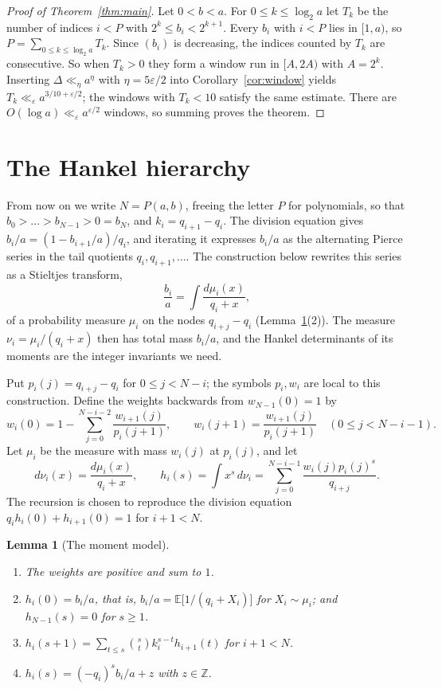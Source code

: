 \documentclass[11pt]{article}
\newtheorem{lemma}[theorem]{Lemma}
\theoremstyle{definition}
\theoremstyle{remark}
\begin{document}
\begin{proof}[Proof of Theorem~\ref{thm:main}]
Let $0<b<a$. For $0\le k\le\log_2 a$ let $T_k$ be the number of indices $i<P$ with
$2^k\le b_i<2^{k+1}$. Every $b_i$ with $i<P$ lies in $[1,a)$, so
$P=\sum_{0\le k\le \log_2 a}T_k$. Since $(b_i)$ is decreasing, the indices counted by $T_k$
are consecutive. So when $T_k>0$ they form a window run in $[A,2A)$ with $A=2^k$.
Inserting $\Delta\ll_\eta a^\eta$ with $\eta=5\varepsilon/2$ into
Corollary~\ref{cor:window} yields
$T_k\ll_\varepsilon a^{3/10+\varepsilon/2}$; the windows with $T_k<10$
satisfy the same estimate. There are $O(\log a)\ll_\varepsilon a^{\varepsilon/2}$
windows, so summing proves the theorem.
\end{proof}

\section{The Hankel hierarchy}\label{sec:hankel}

From now on we write $N=P(a,b)$, freeing the letter $P$ for polynomials, so that
$b_0>\dots>b_{N-1}>0=b_N$, and $k_i=q_{i+1}-q_i$. The division equation
gives $b_i/a=(1-b_{i+1}/a)/q_i$, and iterating it expresses $b_i/a$ as the
alternating Pierce series in the tail quotients $q_i,q_{i+1},\dots$. The
construction below rewrites this series as a Stieltjes transform,
\[
 \frac{b_i}a=\int\frac{d\mu_i(x)}{q_i+x},
\]
of a probability measure $\mu_i$ on the nodes $q_{i+j}-q_i$
(Lemma~\ref{lem:moments}(2)). The measure $\nu_i=\mu_i/(q_i+x)$ then has total
mass $b_i/a$, and the Hankel determinants of its moments are the integer
invariants we need.

Put $p_i(j)=q_{i+j}-q_i$ for $0\le j<N-i$; the symbols $p_i,w_i$
are local to this construction. Define the weights backwards from
$w_{N-1}(0)=1$ by
\[
w_i(0)=1-\sum_{j=0}^{N-i-2}\frac{w_{i+1}(j)}{p_i(j+1)},\qquad
w_i(j+1)=\frac{w_{i+1}(j)}{p_i(j+1)}
\quad(0\le j<N-i-1).
\]
Let $\mu_i$ be the measure with mass $w_i(j)$ at $p_i(j)$, and let
\[
 d\nu_i(x)=\frac{d\mu_i(x)}{q_i+x},\qquad
 h_i(s)=\int x^s\,d\nu_i=\sum_{j=0}^{N-i-1}
 \frac{w_i(j)p_i(j)^s}{q_{i+j}}.
\]
The recursion is chosen to reproduce the division equation
$q_ih_i(0)+h_{i+1}(0)=1$ for $i+1<N$.

\begin{lemma}[The moment model]\label{lem:moments}
\begin{enumerate}
\item The weights are positive and sum to $1$.
\item $h_i(0)=b_i/a$, that is, $b_i/a=\mathbb E\bigl[1/(q_i+X_i)\bigr]$ for $X_i\sim\mu_i$; and
$h_{N-1}(s)=0$ for $s\ge1$.
\item $h_i(s+1)=\sum_{t\le s}\binom st k_i^{s-t}h_{i+1}(t)$ for $i+1<N$.
\item $h_i(s)=(-q_i)^sb_i/a+z$ with $z\in\mathbb Z$.
\end{enumerate}
\end{lemma}
\end{document}
